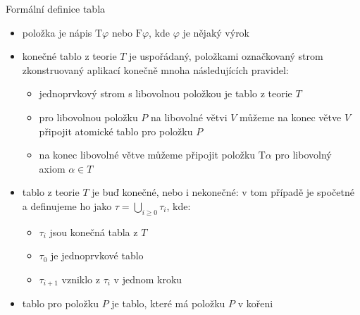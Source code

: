 \documentclass{beamer}
\begin{document}
\begin{frame}{Formální definice tabla}

    \begin{itemize}
        \item \alert{položka} je nápis $\mathrm{T}\varphi$ nebo $\mathrm{F}\varphi$, kde $\varphi$ je nějaký výrok
        \item \alert{konečné tablo z teorie $T$} je uspořádaný, položkami označkovaný strom zkonstruovaný aplikací konečně mnoha následujících pravidel:
        \begin{itemize}
            \item jednoprvkový strom s libovolnou položkou je tablo z teorie $T$
            \item pro libovolnou položku $P$ na libovolné větvi $V$ můžeme na konec větve $V$ připojit atomické tablo pro položku $P$
            \item na konec libovolné větve můžeme připojit položku $\mathrm{T}\alpha$ pro libovolný axiom $\alpha\in T$
        \end{itemize}
        \item \alert{tablo z teorie $T$} je buď konečné, nebo i nekonečné: v tom případě je spočetné a definujeme ho jako $\tau=\bigcup_{i\geq 0}\tau_i$, kde:
        \begin{itemize}
            \item $\tau_i$ jsou konečná tabla z $T$
            \item $\tau_0$ je jednoprvkové tablo
            \item $\tau_{i+1}$ vzniklo z $\tau_i$ v jednom kroku
        \end{itemize}
        \item \alert{tablo pro položku $P$} je tablo, které má položku $P$ v kořeni
    \end{itemize}

\end{frame}
\end{document}
